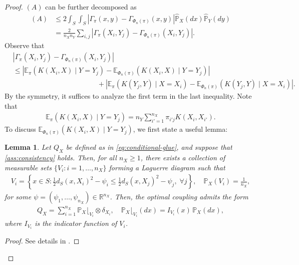 \documentclass{article}
\newtheorem{lemma}{Lemma}
\begin{document}
\begin{proof}
	$(A)$ can be further decomposed as
	\begin{align*}
		(A) &\leq 2\int_S\int_S \left\vert \Gamma_{\pi}(x,y) - \Gamma_{\Phi_n(\pi)}(x,y) \right\vert \hat{\mathbb{P}}_X(dx)\hat{\mathbb{P}}_Y(dy) \\
			&= \frac{2}{n_Xn_Y} \sum_{i,j} \left\vert \Gamma_{\pi}(X_i,Y_j) - \Gamma_{\Phi_n(\pi)}(X_i,Y_j) \right\vert .
	\end{align*}
	Observe that
	\begin{align*}
		&\left\vert \Gamma_{\pi}(X_i,Y_j) - \Gamma_{\Phi_n(\pi)}(X_i,Y_j) \right\vert \\
		&\leq \left\vert \mathbb{E}_{\pi}(K(X_i,X) \mid Y=Y_j) - \mathbb{E}_{\Phi_n(\pi)}(K(X_i,X) \mid Y=Y_j) \right\vert \\
		&\qquad\qquad\qquad\qquad\qquad\qquad + \left\vert \mathbb{E}_{\pi}(K(Y_j,Y) \mid X=X_i) - \mathbb{E}_{\Phi_n(\pi)}(K(Y_j,Y) \mid X=X_i) \right\vert .
	\end{align*}
	By the symmetry, it suffices to analyze the first term in the last inequality. Note that
	\begin{align*}
		\mathbb{E}_{\pi}(K(X_i,X) \mid Y=Y_j) = n_Y \sum_{i' = 1}^{n_X} \pi_{i'j} K(X_i,X_{i'}) .
	\end{align*}
	To discuss $\mathbb{E}_{\Phi_n(\pi)}(K(X_i,X) \mid Y=Y_j)$, we first state a useful lemma:
	\begin{lemma}
		\label{lem:laguerre}
		Let $Q_X$ be defined as in \eqref{eq:conditional-glue}, and suppose that \cref{ass:consistency} holds.
		Then, for all $n_X \ge 1$, there exists a collection of measurable sets 
		$\{V_i : i = 1,\dots,n_X\}$ forming a Laguerre diagram such that
		\begin{align*}
			V_i = \left\{x \in S : \frac{1}{2}d_S(x,X_i)^2 - \psi_i \le \frac{1}{2}d_S(x,X_j)^2 - \psi_j,\;\forall j \right\} , \quad \mathbb{P}_X(V_i) = \frac{1}{n_X} ,
		\end{align*}
		for some $\psi = (\psi_1,\dots,\psi_{n_X}) \in \mathbb{R}^{n_X}$.
		Then, the optimal coupling admits the form
		\begin{align*}
		Q_X = \sum_{i=1}^{n_X} \mathbb{P}_X\lfloor_{V_i} \otimes \delta_{X_i},
		\quad 
		\mathbb{P}_X\lfloor_{V_i}(dx) = I_{V_i}(x)\,\mathbb{P}_X(dx),
		\end{align*}
		where $I_{V_i}$ is the indicator function of $V_i$.
	\end{lemma}
	\begin{proof}
		See details in \cite{peyre2019computational,kitagawa2019convergence,santambrogio2015optimal}.
	\end{proof}
	

\end{proof}
\end{document}

